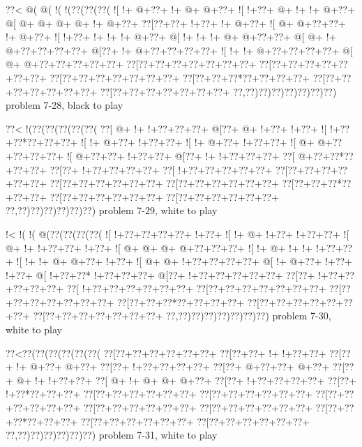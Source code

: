 \vbox{\vbox{\goo
\0??<\- @(\- @(\- !(\- !(\0??(\0??(\0??(
\- ![\- !+\- @+\0??+\- !+\- @+\- @+\0??+
\- ![\- !+\0??+\- @+\- !+\- !+\- @+\0??+
\- @[\- @+\- @+\- @+\- @+\- !+\- @+\0??+
\0??[\0??+\0??+\- !+\0??+\- !+\- @+\0??+
\- ![\- @+\- @+\0??+\0??+\- !+\- @+\0??+
\- ![\- !+\0??+\- !+\- !+\- !+\- @+\0??+
\- @[\- !+\- !+\- !+\- @+\- @+\0??+\0??+
\- @[\- @+\- !+\- @+\0??+\0??+\0??+\0??+
\- @[\0??+\- !+\- @+\0??+\0??+\0??+\0??+
\- ![\- !+\- !+\- @+\0??+\0??+\0??+\0??+
\- @[\- @+\- @+\0??+\0??+\0??+\0??+\0??+
\0??[\0??+\0??+\0??+\0??+\0??+\0??+\0??+
\0??[\0??+\0??+\0??+\0??+\0??+\0??+\0??+
\0??[\0??+\0??+\0??+\0??+\0??+\0??+\0??+
\0??[\0??+\0??+\0??*\0??+\0??+\0??+\0??+
\0??[\0??+\0??+\0??+\0??+\0??+\0??+\0??+
\0??[\0??+\0??+\0??+\0??+\0??+\0??+\0??+
\0??,\0??)\0??)\0??)\0??)\0??)\0??)\0??)
}
\hfil problem 7-28, black to play\hfil\break
}

\vbox{\vbox{\goo
\0??<\- !(\0??(\0??(\0??(\0??(\0??(
\0??[\- @+\- !+\- !+\0??+\0??+\0??+
\- @[\0??+\- @+\- !+\0??+\- !+\0??+
\- ![\- !+\0??+\0??*\0??+\0??+\0??+
\- ![\- !+\- @+\0??+\- !+\0??+\0??+
\- ![\- !+\- @+\0??+\- !+\0??+\0??+
\- ![\- @+\- @+\0??+\0??+\0??+\0??+
\- ![\- @+\0??+\0??+\- !+\0??+\0??+
\- @[\0??+\- !+\- !+\0??+\0??+\0??+
\0??[\- @+\0??+\0??*\0??+\0??+\0??+
\0??[\0??+\- !+\0??+\0??+\0??+\0??+
\0??[\- !+\0??+\0??+\0??+\0??+\0??+
\0??[\0??+\0??+\0??+\0??+\0??+\0??+
\0??[\0??+\0??+\0??+\0??+\0??+\0??+
\0??[\0??+\0??+\0??+\0??+\0??+\0??+
\0??[\0??+\0??+\0??*\0??+\0??+\0??+
\0??[\0??+\0??+\0??+\0??+\0??+\0??+
\0??[\0??+\0??+\0??+\0??+\0??+\0??+
\0??,\0??)\0??)\0??)\0??)\0??)\0??)
}
\hfil problem 7-29, white to play\hfil\break
}

\vbox{\vbox{\goo
\- !<\- !(\- !(\- @(\0??(\0??(\0??(\0??(
\- ![\- !+\0??+\0??+\0??+\0??+\- !+\0??+
\- ![\- !+\- @+\- !+\0??+\- !+\0??+\0??+
\- ![\- @+\- !+\- !+\0??+\0??+\- !+\0??+
\- ![\- @+\- @+\- @+\- @+\0??+\0??+\0??+
\- ![\- !+\- @+\- !+\- !+\- !+\0??+\0??+
\- ![\- !+\- !+\- @+\- @+\0??+\- !+\0??+
\- ![\- @+\- @+\- !+\0??+\0??+\0??+\0??+
\- @[\- !+\- @+\0??+\- !+\0??+\- !+\0??+
\- @[\- !+\0??+\0??*\- !+\0??+\0??+\0??+
\- @[\0??+\- !+\0??+\0??+\0??+\0??+\0??+
\0??[\0??+\- !+\0??+\0??+\0??+\0??+\0??+
\0??[\- !+\0??+\0??+\0??+\0??+\0??+\0??+
\0??[\0??+\0??+\0??+\0??+\0??+\0??+\0??+
\0??[\0??+\0??+\0??+\0??+\0??+\0??+\0??+
\0??[\0??+\0??+\0??*\0??+\0??+\0??+\0??+
\0??[\0??+\0??+\0??+\0??+\0??+\0??+\0??+
\0??[\0??+\0??+\0??+\0??+\0??+\0??+\0??+
\0??,\0??)\0??)\0??)\0??)\0??)\0??)\0??)
}
\hfil problem 7-30, white to play\hfil\break
}

\vbox{\vbox{\goo
\0??<\0??(\0??(\0??(\0??(\0??(\0??(
\0??[\0??+\0??+\0??+\0??+\0??+\0??+
\0??[\0??+\0??+\- !+\- !+\0??+\0??+
\0??[\0??+\- !+\- @+\0??+\- @+\0??+
\0??[\0??+\- !+\0??+\0??+\0??+\0??+
\0??[\0??+\- @+\0??+\0??+\- @+\0??+
\0??[\0??+\- @+\- !+\- !+\0??+\0??+
\0??[\- @+\- !+\- @+\- @+\- @+\0??+
\0??[\0??+\- !+\0??+\0??+\0??+\0??+
\0??[\0??+\- !+\0??*\0??+\0??+\0??+
\0??[\0??+\0??+\0??+\0??+\0??+\0??+
\0??[\0??+\0??+\0??+\0??+\0??+\0??+
\0??[\0??+\0??+\0??+\0??+\0??+\0??+
\0??[\0??+\0??+\0??+\0??+\0??+\0??+
\0??[\0??+\0??+\0??+\0??+\0??+\0??+
\0??[\0??+\0??+\0??*\0??+\0??+\0??+
\0??[\0??+\0??+\0??+\0??+\0??+\0??+
\0??[\0??+\0??+\0??+\0??+\0??+\0??+
\0??,\0??)\0??)\0??)\0??)\0??)\0??)
}
\hfil problem 7-31, white to play\hfil\break
}

